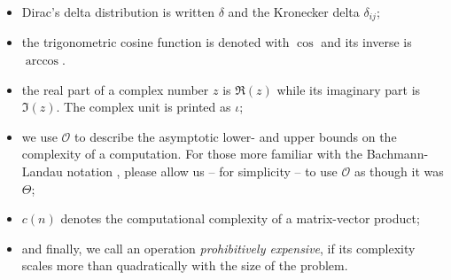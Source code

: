 \begin{itemize}
    \item Dirac's delta distribution is written $\delta$ \cite[chapter~15]{dirac1947quantum}
          and the Kronecker delta $\delta_{ij}$;
    \item the trigonometric cosine function is denoted with $\cos$ and its inverse is $\arccos$.
    \item the real part of a complex number $z$ is $\Re(z)$ while its imaginary part is $\Im(z)$.
          The complex unit is printed as $\iota$;
    \item we use $\mathcal{O}$ to describe the asymptotic lower- and upper bounds
          on the complexity of a computation. For those more familiar with the
          Bachmann-Landau notation \cite[section~3.2]{cormen2009algorithms},
          please allow us -- for simplicity -- to use $\mathcal{O}$ as though it was $\Theta$;
    \item $c(n)$ denotes the computational complexity of a matrix-vector product;
    \item and finally, we call an operation \emph{prohibitively expensive}, if its
          complexity scales more than quadratically with the size of the problem.
\end{itemize}
